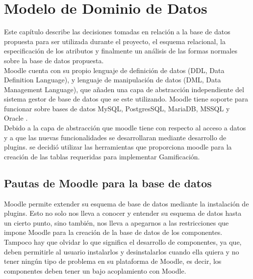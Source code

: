 \chapter{Modelo de Dominio de Datos}
\label{ch:dominioDatos}

Este capítulo describe las decisiones tomadas en relación a la base de datos propuesta para ser utilizada durante el proyecto, el esquema relacional, la especificación de los atributos y finalmente un análisis de las formas normales sobre la base de datos propuesta.\\

    \noindent Moodle cuenta con su propio lenguaje de definición de datos (DDL, Data Definition Language), y lenguaje de manipulación de datos (DML, Data Management Language), que añaden una capa de abstracción independiente del sistema gestor de base de datos que se este utilizando. Moodle tiene soporte para funcionar sobre bases de datos MySQL, PostgresSQL, MariaDB, MSSQL y Oracle \cite{moodleInstall}.\\

    \noindent Debido a la capa de abstracción que moodle tiene con respecto al acceso a datos y a que las nuevas funcionalidades se desarrollaran mediante desarrollo de plugins. se decidió utilizar las herramientas que proporciona moodle para la creación de las tablas requeridas para implementar Gamificación.
    
\section{Pautas de Moodle para la base de datos}
    
Moodle permite extender su esquema de base de datos mediante la instalación de plugins. Esto no solo nos lleva a conocer y entender su esquema de datos hasta un cierto punto, sino también, nos lleva a apegarnos a las restricciones que impone Moodle para la creación de la base de datos de los componentes.\\

    \noindent Tampoco hay que olvidar lo que significa el desarrollo de componentes, ya que, deben permitirle al usuario instalarlos y desinstalarlos cuando ella quiera y no tener ningún tipo de problema en su plataforma de Moodle, es decir, los componentes deben tener un bajo acoplamiento \cite[pp. 244-245]{defAcoplamiento} con Moodle.\\
    

